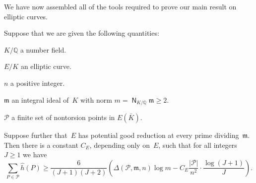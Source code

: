 We have now assembled all of the tools required to prove our main 
result on elliptic curves.

\begin{theorem}
\label{thm:sumhhatPgeD}
Suppose that we are given the following quantities\textup:
\begin{notation}
\item[$K/{\mathbb{Q}}$]
a number field.
\item[$E/K$]
an elliptic curve.
\item[$n$]
a positive integer.
\item[${{\mathfrak{m}}}$]
an integral ideal of~$K$ with norm $m={{\operatorname{\mathsf{N}}}}_{K/{\mathbb{Q}}}{{\mathfrak{m}}}\ge2$.
\item[${{\mathcal P}}$]
a finite set of nontorsion points in $E({{\bar K}})$.
\end{notation}
Suppose further that~$E$ has potential good reduction at every prime
dividing~${{\mathfrak{m}}}$. Then there is a constant $C_E$, depending only on~$E$,
such that for all integers~$J\ge1$ we have
\[
  \sum_{P\in{{\mathcal P}}} {{\hat h}}(P) \ge
  \frac{6}{(J+1)(J+2)}\left({\Delta}({{\mathcal P}},{{\mathfrak{m}}},n)\log m -C_E
  \frac{|{{\mathcal P}}|}{n^2}\cdot\frac{\log(J+1)}{J}\right).
\]
\end{theorem}

